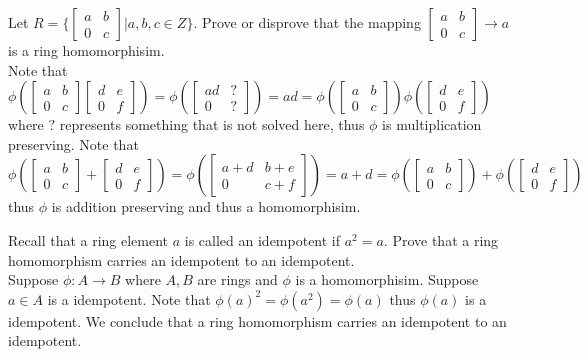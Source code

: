 \documentclass[12pt]{article}
\makeatletter
\theoremstyle{homework}
\newenvironment{exercise}[1]
{\def\@currentlabel{#1}\exercisecore}
{\endexercisecore}
\makeatother
\begin{document}
\begin{exercise}{15.16}
Let $R=\biggr\{\begin{bmatrix}
a & b \\ 0 & c
\end{bmatrix}
\biggr| a,b,c\in Z\biggr\}$. Prove or disprove that the mapping $\begin{bmatrix}
a & b \\ 0 & c
\end{bmatrix}\rightarrow a$ is a ring homomorphisim.\\
Note that $\phi(\begin{bmatrix}
a & b \\ 0 & c
\end{bmatrix}\begin{bmatrix}
d & e \\ 0 & f
\end{bmatrix})=\phi(\begin{bmatrix}
ad & ? \\ 0 & ?
\end{bmatrix})=ad=\phi(\begin{bmatrix}
a & b \\ 0 & c
\end{bmatrix})\phi(\begin{bmatrix}
d & e \\ 0 & f
\end{bmatrix})$ where $?$ represents something that is not solved here, thus $\phi$ is multiplication preserving.  Note that $\phi(\begin{bmatrix}
a & b \\ 0 & c
\end{bmatrix}+\begin{bmatrix}
d & e \\ 0 & f
\end{bmatrix})=\phi(\begin{bmatrix}
a+d & b+e \\ 0 & c+f
\end{bmatrix})=a+d=\phi(\begin{bmatrix}
a & b \\ 0 & c
\end{bmatrix})+\phi(\begin{bmatrix}
d & e \\ 0 & f
\end{bmatrix})$ thus $\phi$ is addition preserving and thus a homomorphisim.
\end{exercise}

\begin{exercise}{15.20}
Recall that a ring element $a$ is called an idempotent if $a^2 = a$. Prove that a ring homomorphism carries an idempotent to an idempotent.\\
Suppose $\phi:A\rightarrow B$ where $A,B$ are rings and $\phi$ is a homomorphisim.  Suppose $a\in A$ is a idempotent.  Note that $\phi(a)^2=\phi(a^2)=\phi(a)$ thus $\phi(a)$ is a idempotent.  We conclude that a ring homomorphism carries an idempotent to an idempotent.
\end{exercise}
\end{document}
